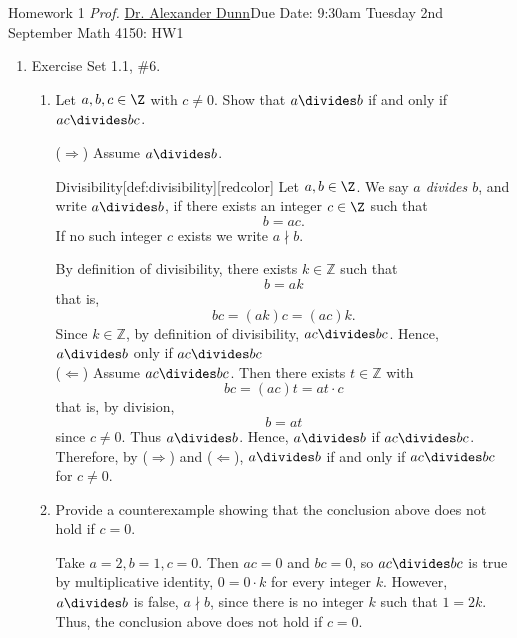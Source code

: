 \newpage{}
{Homework 1}
{\textit{Prof.} \href{https://alexjdunn.weebly.com/}{Dr. Alexander Dunn}}{Due Date: 9:30am Tuesday 2nd September}
{Math 4150: HW1}


\newpage


\begin{enumerate}
  \item Exercise Set 1.1, \#6.
  \begin{enumerate}
    \item Let $a,b, c\in \Z$ with $c\neq 0$. Show that $a\divides b$ if and only if $ac \divides bc$.
    \begin{subprove}
      ($\Rightarrow$) Assume $a\divides b$. 
      \begin{define}{Divisibility}[def:divisibility][redcolor]
      Let $a,b\in\Z$. We say \emph{$a$ divides $b$}, and write $a\divides b$, if there exists an 
      integer $c\in\Z$ such that
      \[
      b = a c.
      \]
      If no such integer $c$ exists we write $a\nmid b$.
      \end{define}
      By definition of divisibility, there exists $k\in\mathbb{Z}$ such that
      \[
        b = a k
      \]
      that is,
      \[
        bc = (a k)c = (ac)k.
      \]
      Since $k\in\mathbb{Z}$, by definition of divisibility, $ac\divides bc$. 
      Hence, $a\divides b$ only if $ac \divides bc$\vspace*{10px}\\
      ($\Leftarrow$) Assume $ac\divides bc$. Then there exists $t\in\mathbb{Z}$ with
      \[
        bc = (ac)t = at\cdot c
      \]
      that is, by division,
      \[
        b = a t
      \]
      since $c\neq 0$.
      Thus $a\divides b$. Hence, $a\divides b$ if $ac \divides bc$.\vspace*{10px}\\
      Therefore, by ($\Rightarrow$) and ($\Leftarrow$), $a\divides b$ if and only if $ac \divides bc$ for $c\neq 0$.
    \end{subprove}

    \item Provide a counterexample showing that the conclusion above does not hold if $c = 0$.
    \begin{subanswer}
      Take $a=2, b=1, c=0$. Then $ac = 0$ and $bc=0$, so $ac\divides bc$ is true by 
      multiplicative identity, $0=0\cdot k$ for every integer $k$.
      However,  $a\divides b$ is false, $a\nmid b$, since there is no integer $k$ such that $1=2k$. 
      Thus, the conclusion above does not hold if $c = 0$.
    \end{subanswer}
  \end{enumerate}


\end{enumerate}
